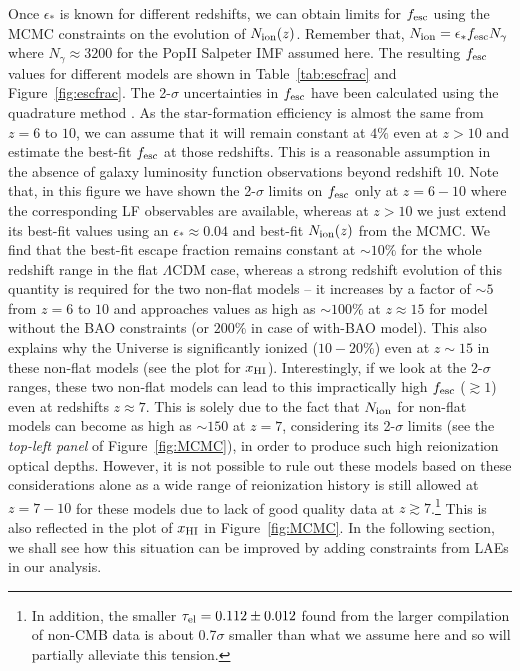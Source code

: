 \documentclass[useAMS,usenatbib]{mnras}
\begin{document}
Once $\epsilon_*$ is known for different redshifts, we can obtain limits for $f_{\rm esc}$
using the MCMC constraints on the evolution of $N_{\rm ion}(z)$. Remember that, $N_{\rm ion}=\epsilon_*f_{\rm esc}N_\gamma$
where $N_{\gamma} \approx 3200$ for the PopII Salpeter IMF assumed here. The resulting $f_{\rm esc}$ values for different models
are shown in Table~\ref{tab:escfrac} and Figure~\ref{fig:escfrac}. The 2-$\sigma$ uncertainties in $f_{\rm esc}$
have been calculated using the quadrature method \citep{mitra3}.
As the star-formation efficiency is almost the same from $z=6$ to $10$, we can assume that
it will remain constant at $4\%$ even at $z>10$ and estimate the best-fit $f_{\rm esc}$ at those redshifts.
This is a reasonable assumption in the absence of galaxy luminosity function observations beyond redshift $10$.
Note that, in this figure we have shown the 2-$\sigma$ limits on $f_{\rm esc}$ only at $z=6-10$ where the
corresponding LF observables are available, whereas at $z>10$ we just extend its best-fit values
using an $\epsilon_*\approx0.04$ and best-fit $N_{\rm ion}(z)$ from the MCMC.
We find that the best-fit escape fraction remains constant at
$\sim 10\%$ for the whole redshift range in the flat $\Lambda$CDM case, whereas a strong redshift evolution of this
quantity is required for the two non-flat models -- it increases by a factor of
$\sim 5$ from $z=6$ to $10$ and approaches values as high as $\sim 100\%$ at $z\approx15$
for model without the BAO constraints (or $200\%$ in case of with-BAO model).
This also explains why the Universe is significantly ionized ($10-20\%$) even at $z\sim15$ in these non-flat
models (see the plot for $x_{\rm HI}$).
Interestingly, if we look at the 2-$\sigma$ ranges, these two non-flat models can lead to this impractically
high $f_{\rm esc}$ ($\gtrsim1$) even at redshifts $z\approx7$.
This is solely due to the fact that
$N_{\rm ion}$ for non-flat models can become as high as $\sim150$ at $z=7$, considering its 2-$\sigma$ limits
(see the {\it top-left panel} of Figure~\ref{fig:MCMC}), in order to produce such high reionization optical depths.
However, it is not possible to rule out these models based on these considerations alone as a wide range of
reionization history is still allowed at $z=7-10$ for these models due to lack of good quality
data at $z\gtrsim7$.\footnote{In addition, the smaller $\tau_{\rm el} = 0.112 \pm 0.012$
\citep{2018arXiv180305522P} found from the larger compilation of non-CMB data is about 0.7$\sigma$ smaller
than what we assume here and so will partially alleviate this tension.}       
This is also reflected in the plot of $x_{\rm HI}$ in Figure~\ref{fig:MCMC}.
In the following section, we shall see how this situation can be improved by adding constraints from LAEs
in our analysis.
\end{document}
